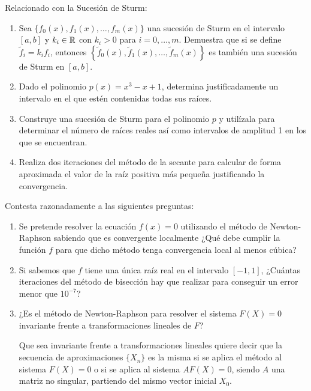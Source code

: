 \begin{ejercicio} Relacionado con la Sucesión de Sturm:
    \begin{enumerate}
        \item Sea $\{f_0(x), f_1(x), \ldots, f_m(x)\}$ una sucesión de Sturm en el intervalo $[a, b]$ y $k_i \in \mathbb{R}$ con $k_i > 0$ para $i = 0, \ldots, m$. Demuestra que si se define $\tilde{f}_i = k_i f_i$, entonces $\left\{\tilde{f}_0(x), \tilde{f}_1(x), \ldots, \tilde{f}_m(x)\right\}$ es también una sucesión de Sturm en $[a, b]$.
        \item Dado el polinomio $p(x) = x^3 - x + 1$, determina justificadamente un intervalo en el que estén contenidas todas sus raíces.
        \item Construye una sucesión de Sturm para el polinomio $p$ y utilízala para determinar el número de raíces reales así como intervalos de amplitud 1 en los que se encuentran.
        \item Realiza dos iteraciones del método de la secante para calcular de forma aproximada el valor de la raíz positiva más pequeña justificando la convergencia.
    \end{enumerate}
\end{ejercicio}

\begin{ejercicio}
    Contesta razonadamente a las siguientes preguntas:
    \begin{enumerate}
        \item Se pretende resolver la ecuación $f(x) = 0$ utilizando el método de Newton-Raphson sabiendo que es convergente localmente ¿Qué debe cumplir la función $f$ para que dicho método tenga convergencia local al menos cúbica?
        \item Si sabemos que $f$ tiene una única raíz real en el intervalo $[-1, 1]$, ¿Cuántas iteraciones del método de bisección hay que realizar para conseguir un error menor que $10^{-7}$?
        \item ¿Es el método de Newton-Raphson para resolver el sistema $F(X) = 0$ invariante frente a transformaciones lineales de $F$?
        \begin{observacion}
            Que sea invariante frente a transformaciones lineales quiere decir que la secuencia de aproximaciones $\{X_n\}$ es la misma si se aplica el método al sistema $F(X) = 0$ o si se aplica al sistema $AF(X) = 0$, siendo $A$ una matriz no singular, partiendo del mismo vector inicial $X_0$.
        \end{observacion}
    \end{enumerate}
\end{ejercicio}

